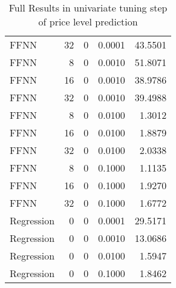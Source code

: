 \begin{table}[h!]
\begin{adjustbox}{max width=\textwidth}
\begin{tabular}{lrrrr}
  FFNN &    32 &     0 & 0.0001 & 43.5501 \\ 
  FFNN &     8 &     0 & 0.0010 & 51.8071 \\ 
  FFNN &    16 &     0 & 0.0010 & 38.9786 \\ 
  FFNN &    32 &     0 & 0.0010 & 39.4988 \\ 
  FFNN &     8 &     0 & 0.0100 & 1.3012 \\ 
  FFNN &    16 &     0 & 0.0100 & 1.8879 \\ 
  FFNN &    32 &     0 & 0.0100 & 2.0338 \\ 
  FFNN &     8 &     0 & 0.1000 & 1.1135 \\ 
  FFNN &    16 &     0 & 0.1000 & 1.9270 \\ 
  FFNN &    32 &     0 & 0.1000 & 1.6772 \\ 
  Regression &     0 &     0 & 0.0001 & 29.5171 \\ 
  Regression &     0 &     0 & 0.0010 & 13.0686 \\ 
  Regression &     0 &     0 & 0.0100 & 1.5947 \\ 
  Regression &     0 &     0 & 0.1000 & 1.8462 \\ 
   \hline
 \end{tabular}
\end{adjustbox}
\caption{Full Results in univariate tuning step of price level prediction} 
\label{tab:level.par.tuning.full}
\end{table}

